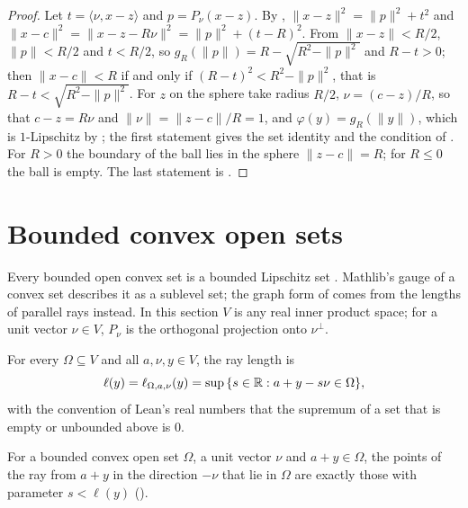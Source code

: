 \begin{proof}
\leanok
Let $t = \langle \nu, x - z \rangle$ and $p = P_\nu(x - z)$. By ,
$\|x - z\|^2 = \|p\|^2 + t^2$ and $\|x - c\|^2 = \|x - z - R\nu\|^2 = \|p\|^2 + (t - R)^2$. From
$\|x - z\| < R/2$, $\|p\| < R/2$ and $t < R/2$, so $g_R(\|p\|) = R - \sqrt{R^2 - \|p\|^2}$ and
$R - t > 0$; then $\|x - c\| < R$ if and only if $(R - t)^2 < R^2 - \|p\|^2$, that is
$R - t < \sqrt{R^2 - \|p\|^2}$. For $z$ on the sphere take radius $R/2$, $\nu = (c - z)/R$, so
that $c - z = R\nu$ and $\|\nu\| = \|z - c\|/R = 1$, and $\varphi(y) = g_R(\|y\|)$, which is
$1$-Lipschitz by ; the first statement gives the set identity and the
condition of . For $R > 0$ the boundary of the ball lies in the
sphere $\|z - c\| = R$; for $R \leq 0$ the ball is empty. The last statement is
.
\end{proof}

\section{Bounded convex open sets}
\label{sec:convex-domains}

Every bounded open convex set is a bounded Lipschitz set \cite[Corollary 1.2.2.3]{Grisvard}.
Mathlib's gauge of a
convex set describes it as a sublevel set; the graph form of 
comes from the lengths of parallel rays instead. In this section $V$ is any real inner product
space; for a unit vector $\nu \in V$, $P_\nu$ is the orthogonal projection onto $\nu^\perp$.

\begin{definition}
\label{def:ray-length}
\leanok
For every $\Omega \subseteq V$ and all $a, \nu, y \in V$, the ray length is
\[
  \ell(y) = \ell_{\Omega, a, \nu}(y) = \sup\, \{s \in \mathbb{R} : a + y - s \nu \in \Omega\} ,
\]
with the convention of Lean's real numbers that the supremum of a set that is empty or unbounded
above is $0$.
\end{definition}

For a bounded convex open set $\Omega$, a unit vector $\nu$ and $a + y \in \Omega$, the points of
the ray from $a + y$ in the direction $-\nu$ that lie in $\Omega$ are exactly those with parameter
$s < \ell(y)$ ().

